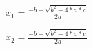\documentclass{article}
\begin{document}
$ x_1 = \frac{-b-\sqrt{b^2-4*a*c}}{2a} $
\pagebreak

$ x_2 = \frac{-b+\sqrt{b^2-4*a*c}}{2a} $
\pagebreak
\end{document}
